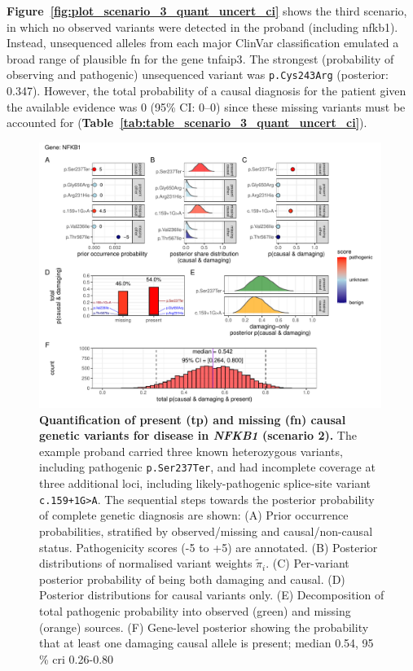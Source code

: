 \textbf{Figure~\ref{fig:plot_scenario_3_quant_uncert_ci}} shows the third scenario, in which no observed variants were detected in the proband (including \ac{nfkb1}). 
Instead, unsequenced alleles from each major ClinVar classification emulated a broad range of plausible \ac{fn} for the gene \ac{tnfaip3}.
The strongest (probability of observing and pathogenic) unsequenced variant was \texttt{p.Cys243Arg} (posterior: 0.347). 
However, the total probability of a causal diagnosis for the patient given the available evidence was 0 (95\% CI: 0--0) since these missing variants must be accounted for (\textbf{Table~\ref{tab:table_scenario_3_quant_uncert_ci}}).



\begin{figure}[ht]
  \centering
  \includegraphics[width=0.99\textwidth]{../images/plot_scenario_2_quant_uncert_ci.pdf}
  \caption{
    \textbf{Quantification of present (\ac{tp}) and missing (\ac{fn}) causal genetic variants for disease in \textit{NFKB1} (scenario 2).}
    The example proband carried three known heterozygous variants, including pathogenic \texttt{p.Ser237Ter}, and had incomplete coverage at three additional loci, including likely-pathogenic splice-site variant \texttt{c.159+1G{\small\textgreater}A}.  The sequential steps towards the posterior  probability of complete genetic diagnosis are shown:
    (A) Prior occurrence probabilities, stratified by observed/missing and causal/non-causal status. Pathogenicity scores (-5 to +5) are annotated.
    (B) Posterior distributions of normalised variant weights \(\tilde{\pi}_i\).  
    (C) Per-variant posterior probability of being both damaging and causal.  
    (D) Posterior distributions for causal variants only.  
    (E) Decomposition of total pathogenic probability into observed (green) and missing (orange) sources.  
    (F) Gene-level posterior showing the probability that at least one damaging causal allele is present; median 0.54, 95\,\% \ac{cri} 0.26-0.80    
  }
  \label{fig:plot_scenario_2_quant_uncert_ci}
\end{figure}


